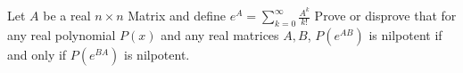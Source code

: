 Let \(A\) be a real \(n\times n\) Matrix and define \(e^{A}=\sum_{k=0}^{\infty} \frac{A^{k}}{k!}\)
Prove or disprove that for any real polynomial \(P(x)\) and any real matrices \(A,B\),
\(P(e^{AB})\) is nilpotent if and only if \(P(e^{BA})\) is nilpotent.